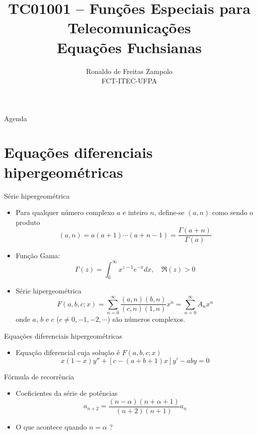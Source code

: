 \documentclass[
size=17pt,
paper=smartboard,
mode=present,
display=slidesnotes,
style=paintings,
nopagebreaks,
blackslide,
fleqn]{powerdot}
\title{\Large TC01001 -- Funções Especiais para Telecomunicações\\ \vspace{1cm}Equações Fuchsianas}
\author{Ronaldo de Freitas Zampolo\\FCT-ITEC-UFPA}
\date{ }
\begin{document}
   \maketitle[randomdots={false}]
   \begin{slide}{Agenda}
      \tableofcontents[content=sections]
   \end{slide}

   \section[ slide = true]{Equações diferenciais hipergeométricas}
      \begin{slide}[toc=]{Série hipergeométrica}
         \begin{itemize}
		 \item Para qualquer número complexo $a$ e inteiro $n$, define-se $(a,n)$ como sendo o produto 
		    \begin{equation}
			    (a,n) = a (a+1) \cdots (a+n-1) = \frac{\Gamma(a+n)}{\Gamma(a)}
		    \end{equation}
		\item Função Gama:
			\begin{equation}
				\Gamma(z) = \int_0^\infty x^{z-1}e^{-x}dx, \quad \Re(z)>0
			\end{equation}
				
		 \item Série hipergeométrica
		    \begin{equation}
			    F(a,b,c;x) = \sum_{n=0}^\infty \frac{(a,n)(b,n)}{(c,n)(1,n)}x^n = \sum_{n=0}^\infty A_nx^n
		    \end{equation}
			 onde $a$, $b$ e $c$ ($c\neq 0, -1, -2, \cdots$) são números complexos.
         \end{itemize}
      \end{slide}
      
      \begin{slide}[toc=]{Equações diferenciais hipergeométricas}
         \begin{itemize}
		 \item Equação diferencial cuja solução é $F(a,b,c;x)$
		    \begin{equation}
			    x (1-x)y''+[c-(a+b+1)x]y' - aby = 0
		    \end{equation}
         \end{itemize}         
      \end{slide}
      
      \begin{slide}[toc=]{Fórmula de recorrência}
        \begin{itemize}
		\item Coeficientes da série de potências
			\begin{equation}
				a_{n+2} = \frac{(n-\alpha)(n+\alpha+1)}{(n+2)(n+1)} a_n
			\end{equation}
		\item O que acontece quando $n=\alpha$ ?
          \end{itemize}
       \end{slide}
  
\end{document}
